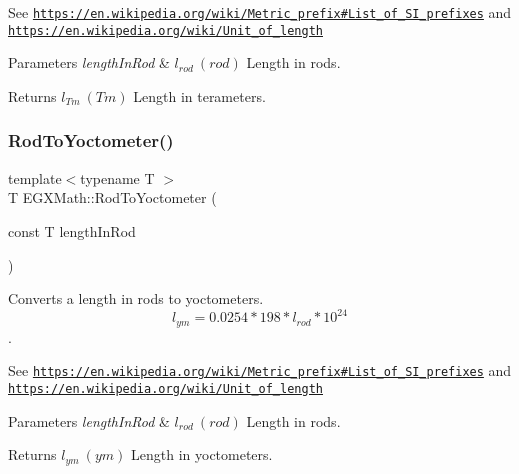 See \href{https://en.wikipedia.org/wiki/Metric_prefix#List_of_SI_prefixes}{\tt https\+://en.\+wikipedia.\+org/wiki/\+Metric\+\_\+prefix\#\+List\+\_\+of\+\_\+\+S\+I\+\_\+prefixes} and \href{https://en.wikipedia.org/wiki/Unit_of_length}{\tt https\+://en.\+wikipedia.\+org/wiki/\+Unit\+\_\+of\+\_\+length} 
\begin{DoxyParams}{Parameters}
{\em length\+In\+Rod} & $ l_{rod}\ (rod)$ Length in rods. \\
\hline
\end{DoxyParams}
\begin{DoxyReturn}{Returns}
$ l_{Tm}\ (Tm)$ Length in terameters. 
\end{DoxyReturn}
\mbox{\label{group___e_g_x_math-_conversions-_length_conversions-_imperial-_rod-_s_i_ga8ed4c9bfa230e77380ff81ff9ed59a6e}} 
\subsubsection{\texorpdfstring{Rod\+To\+Yoctometer()}{RodToYoctometer()}}
{\footnotesize\ttfamily template$<$typename T $>$ \\
T E\+G\+X\+Math\+::\+Rod\+To\+Yoctometer (\begin{DoxyParamCaption}\item[{const T}]{length\+In\+Rod }\end{DoxyParamCaption})}



Converts a length in rods to yoctometers. \[ l_{ym}=0.0254 * 198 * l_{rod} * 10^{24} \]. 

See \href{https://en.wikipedia.org/wiki/Metric_prefix#List_of_SI_prefixes}{\tt https\+://en.\+wikipedia.\+org/wiki/\+Metric\+\_\+prefix\#\+List\+\_\+of\+\_\+\+S\+I\+\_\+prefixes} and \href{https://en.wikipedia.org/wiki/Unit_of_length}{\tt https\+://en.\+wikipedia.\+org/wiki/\+Unit\+\_\+of\+\_\+length} 
\begin{DoxyParams}{Parameters}
{\em length\+In\+Rod} & $ l_{rod}\ (rod)$ Length in rods. \\
\hline
\end{DoxyParams}
\begin{DoxyReturn}{Returns}
$ l_{ym}\ (ym)$ Length in yoctometers. 
\end{DoxyReturn}
\mbox{\label{group___e_g_x_math-_conversions-_length_conversions-_imperial-_rod-_s_i_ga0e3f1a816c8a67c7825b3b82ecf54b26}} 

